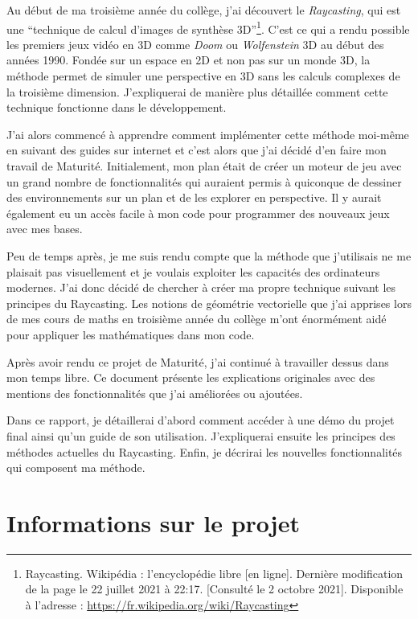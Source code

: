 \documentclass[11pt,french,a4paper,]{article}
\begin{document}
Au début de ma troisième année du collège, j'ai découvert le
\emph{Raycasting}, qui est une ``technique de calcul d'images de
synthèse 3D''\footnote{Raycasting. Wikipédia : l'encyclopédie libre
  {[}en ligne{]}. Dernière modification de la page le 22 juillet 2021 à
  22:17. {[}Consulté le 2 octobre 2021{]}. Disponible à l'adresse :
  \url{https://fr.wikipedia.org/wiki/Raycasting}}. C'est ce qui a rendu
possible les premiers jeux vidéo en 3D comme \emph{Doom} ou
\emph{Wolfenstein} 3D au début des années 1990. Fondée sur un espace en
2D et non pas sur un monde 3D, la méthode permet de simuler une
perspective en 3D sans les calculs complexes de la troisième dimension.
J'expliquerai de manière plus détaillée comment cette technique
fonctionne dans le développement.

J'ai alors commencé à apprendre comment implémenter cette méthode
moi-même en suivant des guides sur internet et c'est alors que j'ai
décidé d'en faire mon travail de Maturité. Initialement, mon plan était
de créer un moteur de jeu avec un grand nombre de fonctionnalités qui
auraient permis à quiconque de dessiner des environnements sur un plan
et de les explorer en perspective. Il y aurait également eu un accès
facile à mon code pour programmer des nouveaux jeux avec mes bases.

Peu de temps après, je me suis rendu compte que la méthode que
j'utilisais ne me plaisait pas visuellement et je voulais exploiter les
capacités des ordinateurs modernes. J'ai donc décidé de chercher à créer
ma propre technique suivant les principes du Raycasting. Les notions de
géométrie vectorielle que j'ai apprises lors de mes cours de maths en
troisième année du collège m'ont énormément aidé pour appliquer les
mathématiques dans mon code.

Après avoir rendu ce projet de Maturité, j'ai continué à travailler
dessus dans mon temps libre. Ce document présente les explications
originales avec des mentions des fonctionnalités que j'ai améliorées ou
ajoutées.

Dans ce rapport, je détaillerai d'abord comment accéder à une démo du
projet final ainsi qu'un guide de son utilisation. J'expliquerai ensuite
les principes des méthodes actuelles du Raycasting. Enfin, je décrirai
les nouvelles fonctionnalités qui composent ma méthode.

\hypertarget{informations-sur-le-projet}{%
\section{Informations sur le projet}\label{informations-sur-le-projet}}
\end{document}
